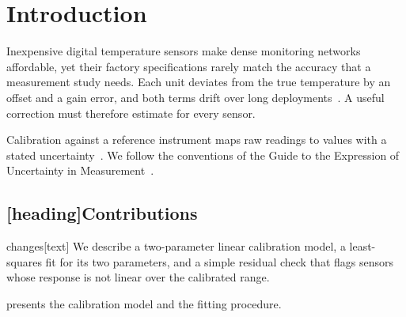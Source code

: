 %
\section{Introduction}
\label{sec:introduction}

Inexpensive digital temperature sensors make dense monitoring networks
affordable, yet their factory specifications rarely match the accuracy that a
measurement study needs. Each unit deviates from the true temperature by an
offset and a gain error, and both terms drift over long
deployments~\cite{example2024drift}.
A useful correction must therefore estimate 
for every sensor.

Calibration against a reference instrument maps raw readings to values with a
stated uncertainty~\cite{taylor1997errors}. We follow the conventions of the
Guide to the Expression of Uncertainty in Measurement~\cite{jcgm2008gum}.


\subsection{[heading]{Contributions}}

\begin{MarkEnv}{changes}[text]
We describe a two-parameter linear calibration model, a least-squares fit for its
two parameters, and a simple residual check that flags sensors whose response
is not linear over the calibrated range.
\end{MarkEnv}

 presents the calibration model and the fitting procedure.
